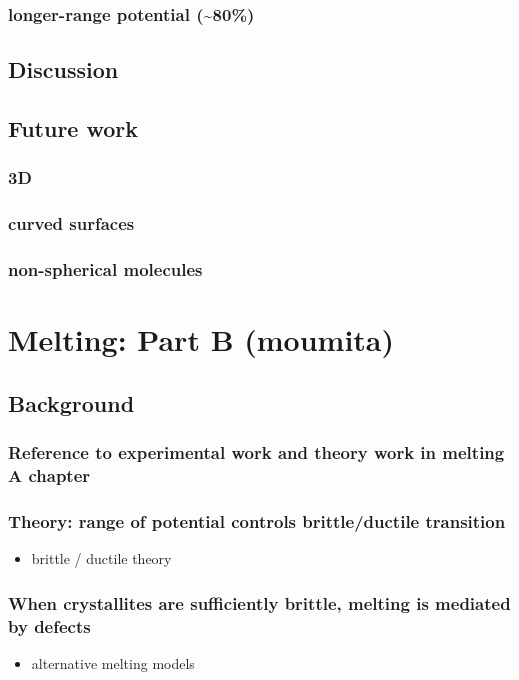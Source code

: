 \documentclass{umthesis}
\begin{document}
\subsection{longer-range potential (\~{}80\%)}
\label{sec-1.7.2}
\section{Discussion}
\label{sec-1.8}
\section{Future work}
\label{sec-1.9}
\subsection{3D}
\label{sec-1.9.1}
\subsection{curved surfaces}
\label{sec-1.9.2}
\subsection{non-spherical molecules}
\label{sec-1.9.3}
\chapter{Melting: Part B (moumita)}
\label{sec-2}
\section{Background}
\label{sec-2.1}
\subsection{Reference to experimental work and theory work in melting A chapter}
\label{sec-2.1.1}
\subsection{Theory: range of potential controls brittle/ductile transition}
\label{sec-2.1.2}
\begin{itemize}

\item brittle / ductile theory\\
\label{sec-2.1.2.1}%
\end{itemize} %
\subsection{When crystallites are sufficiently brittle, melting is mediated by defects}
\label{sec-2.1.3}
\begin{itemize}

\item alternative melting models\\
\label{sec-2.1.3.1}%
\end{itemize} %
\end{document}
